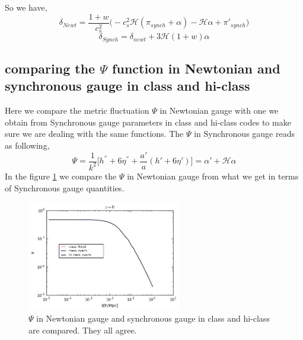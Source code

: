 \documentclass[a4paper,14pt]{article}
\newcommand {\be}{\begin{equation}}
\newcommand {\ee}{\end{equation}}
\begin{document}
So we have,
\be
\delta_{Newt}= \frac{1+w}{c_s^2} \Big ( -c_s^2 \mathcal{H} (\pi_{synch} + \alpha)- \mathcal{H} \alpha+\pi'_{synch}  \Big )
\ee
\be
\delta_{Synch}= \delta_{newt} + 3 \mathcal{H} (1+w) \alpha
\ee
\subsection{comparing the $\Psi$ function in Newtonian and synchronous gauge in class and hi-class}
Here we compare the metric fluctuation $\Psi$  in Newtonian gauge with one we obtain from Synchronous gauge parameters in class and hi-class codes to make sure we are dealing with the same functions. The $\Psi$ in Synchronous gauge reads as following,
\be
\Psi=\frac{1}{k^2} \Big [ {h^{''}}+ 6 {\eta^{''}} + \frac{a'}{a}  (h'+6 \eta ') \Big]= \alpha' + \mathcal{H}\alpha
\ee
In the figure \ref{psicomp} we compare the $\Psi$ in Newtonian gauge from what we get in terms of Synchronous gauge quantities.
\begin{figure}[H]
\begin{center}
\captionsetup{,margin=1cm}
\includegraphics[width=0.60\textwidth]{psi_comp.jpg} 
\caption{$\Psi$ in Newtonian gauge and synchronous gauge in class and hi-class are compared. They all agree. }
\label{psicomp}
\end{center}
\end{figure}
\end{document}
